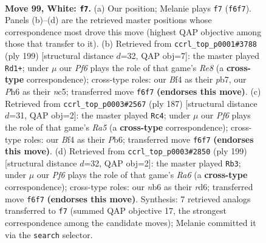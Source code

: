 \documentclass[11pt]{article}
\begin{document}
\clearpage

\begin{figure}[p]\centering
\begin{subfigure}{0.46\textwidth}\centering
\resizebox{\linewidth}{!}{%
\newchessgame
\chessboard[
  setfen={7k/1r6/1n3P1P/1R6/p4B2/P7/6K1/8 w - - 7 99},
  showmover=false,
  pgfstyle=straightmove, color=movearrow, markmove={f6-f7}
]}
\caption{}
\end{subfigure}\hfill
\begin{subfigure}{0.46\textwidth}\centering
\resizebox{\linewidth}{!}{%
\newchessgame
\chessboard[
  setfen={3R4/1P5k/8/2N4p/3K2pP/6b1/8/4r3 b - - 18 100},
  showmover=false,
  pgfstyle=straightmove, color=movearrow, markmove={e1-d1}
]}
\caption{}
\end{subfigure}
\\[4pt]
\begin{subfigure}{0.46\textwidth}\centering
\resizebox{\linewidth}{!}{%
\newchessgame
\chessboard[
  setfen={8/8/1p6/1p4k1/r6p/PK1N1R2/8/8 b - - 49 94},
  showmover=false,
  pgfstyle=straightmove, color=movearrow, markmove={a4-c4}
]}
\caption{}
\end{subfigure}\hfill
\begin{subfigure}{0.46\textwidth}\centering
\resizebox{\linewidth}{!}{%
\newchessgame
\chessboard[
  setfen={8/7p/3R3P/6k1/6p1/r7/6K1/8 b - - 3 100},
  showmover=false,
  pgfstyle=straightmove, color=movearrow, markmove={a3-b3}
]}
\caption{}
\end{subfigure}
\caption{\textbf{Move 99, White: \texttt{f7}.} (a) Our position; Melanie plays \texttt{f7} (\texttt{f6f7}). Panels (b)--(d) are the retrieved master positions whose correspondence most drove this move (highest QAP objective among those that transfer to it). (b) Retrieved from \texttt{ccrl\_top\_p0001\#3788} (ply 199) [structural distance $d$=32, QAP obj=7]: the master played \texttt{Rd1+}; under $\mu$ our \emph{Pf6} plays the role of that game's \emph{Re8} (a \textbf{cross-type} correspondence); cross-type roles: our \emph{B}f4 as their \emph{p}b7, our \emph{P}h6 as their \emph{n}c5; transferred move \texttt{f6f7} \textbf{(endorses this move)}. (c) Retrieved from \texttt{ccrl\_top\_p0003\#2567} (ply 187) [structural distance $d$=31, QAP obj=2]: the master played \texttt{Rc4}; under $\mu$ our \emph{Pf6} plays the role of that game's \emph{Ra5} (a \textbf{cross-type} correspondence); cross-type roles: our \emph{B}f4 as their \emph{P}b6; transferred move \texttt{f6f7} \textbf{(endorses this move)}. (d) Retrieved from \texttt{ccrl\_top\_p0003\#2850} (ply 199) [structural distance $d$=32, QAP obj=2]: the master played \texttt{Rb3}; under $\mu$ our \emph{Pf6} plays the role of that game's \emph{Ra6} (a \textbf{cross-type} correspondence); cross-type roles: our \emph{n}b6 as their \emph{r}d6; transferred move \texttt{f6f7} \textbf{(endorses this move)}. Synthesis: 7 retrieved analogs transferred to \texttt{f7} (summed QAP objective 17, the strongest correspondence among the candidate moves); Melanie committed it via the \texttt{search} selector.}
\label{fig:thought-m196}
\end{figure}
\end{document}
